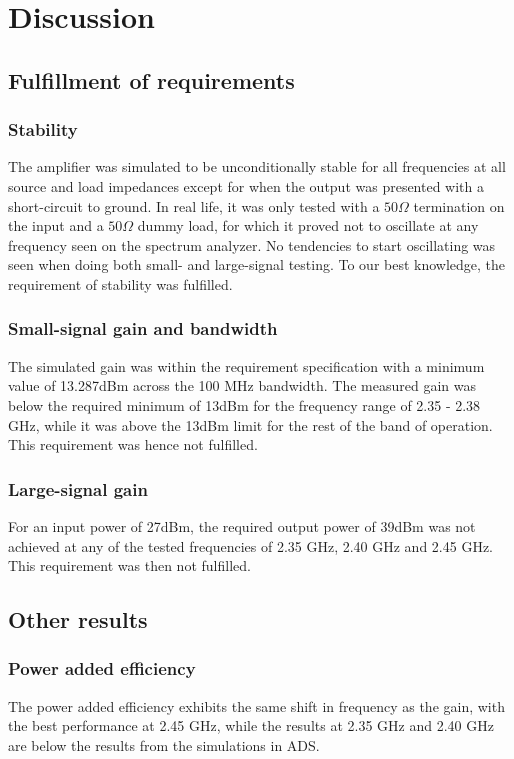 \chapter{Discussion}

  \section{Fulfillment of requirements}
	\subsection{Stability}
	The amplifier was simulated to be unconditionally stable for all frequencies at all source and load impedances except for when the output was presented with a short-circuit to ground. In real life, it was only tested with a $50 \Omega$ termination on the input and a $50 \Omega$ dummy load, for which it proved not to oscillate at any frequency seen on the spectrum analyzer. No tendencies to start oscillating was seen when doing both small- and large-signal testing. To our best knowledge, the requirement of stability was fulfilled.
	\subsection{Small-signal gain and bandwidth}
	The simulated gain was within the requirement specification with a minimum value of 13.287dBm across the 100 MHz bandwidth. The measured gain was below the required minimum of 13dBm for the frequency range of 2.35 - 2.38 GHz, while it was above the 13dBm limit for the rest of the band of operation. This requirement was hence not fulfilled.
	\subsection{Large-signal gain}
	For an input power of 27dBm, the required output power of 39dBm was not achieved at any of the tested frequencies of 2.35 GHz, 2.40 GHz and 2.45 GHz. This requirement was then not fulfilled.
  \section{Other results}
	\subsection{Power added efficiency}
	The power added efficiency exhibits the same shift in frequency as the gain, with the best performance at 2.45 GHz, while the results at 2.35 GHz and 2.40 GHz are below the results from the simulations in ADS. 
